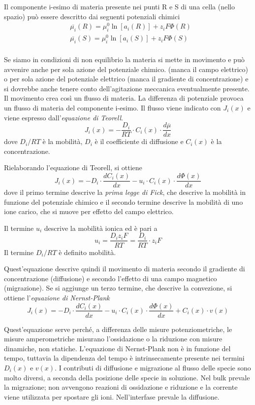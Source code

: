 
Il componente i-esimo di materia presente nei punti R e S di una cella (nello spazio) può essere descritto dai seguenti potenziali chimici
\begin{align*}
& \overline{\mu_i} (R) = \mu^0_i \ln [a_i (R)] + z_i F \Phi (R)\\
& \overline{\mu_i} (S) = \mu^0_i \ln [a_i (S)] + z_i F \Phi (S)\\
\end{align*}

Se siamo in condizioni di non equilibrio la materia si mette in movimento e può avvenire anche per sola azione del potenziale chimico.
(manca il campo elettrico) o per sola azione del potenziale elettrico (manca il gradiente di concentrazione) e si dovrebbe anche tenere conto dell'agitazione meccanica
eventualmente presente.
Il movimento crea così un flusso di materia.
La differenza di potenziale provoca un flusso di materia del componente i-esimo.
Il flusso viene indicato con $J_i (x)$ e viene espresso dall'\emph{equazione di Teorell}.
\[
J_i (x) = -\frac{D_i}{RT} \cdot C_i (x) \cdot \frac{d \overline{\mu}}{dx}
\]
dove $D_i / RT$ è la mobilità, $D_i$ è il coefficiente di diffusione e $C_i (x)$ è la concentrazione.

Rielaborando l'equazione di Teorell, si ottiene
\[
J_i (x) = - D_i \cdot \frac{dC_i (x)}{dx} - u_i \cdot C_i (x) \cdot \frac{d \Phi (x)}{dx}
\]
dove il primo termine descrive la \emph{prima legge di Fick}, che descrive la mobilità in funzione del potenziale chimico e il secondo termine descrive la mobilità di uno ione carico, che si muove per effetto del campo elettrico.

Il termine $u_i$ descrive la mobilità ionica ed è pari a
\[
u_i = \frac{D_i z_i F}{RT} = \frac{D_i}{RT} \cdot z_i F
\]
Il termine $D_i / RT$ è definito mobilità.

Quest'equazione descrive quindi il movimento di materia secondo il gradiente di concentrazione (diffusione) e secondo l'effetto di una campo magnetico (migrazione).
Se si aggiunge un terzo termine, che descrive la convezione, si ottiene l'\emph{equazione di Nernst-Plank}
\[
J_i (x) = - D_i \cdot \frac{dC_i (x)}{dx} - u_i \cdot C_i (x) \cdot \frac{d \Phi (x)}{dx} + C_i (x) \cdot v (x)
\]

Quest'equazione serve perché, a differenza delle misure potenziometriche, le misure amperometriche misurano l'ossidazione o la riduzione con misure dinamiche, non statiche.
L'equazione di Nernst-Plank non è in funzione del tempo, tuttavia la dipendenza del tempo è intrinsecamente presente nei termini $D_i (x)$ e $v (x)$.
I contributi di diffusione e migrazione al flusso delle specie sono molto diversi, a seconda della posizione delle specie in soluzione.
Nel bulk prevale la migrazione; non avvengono reazioni di ossidazione e riduzione e la corrente viene utilizzata per spostare gli ioni.
Nell'interfase prevale la diffusione.

